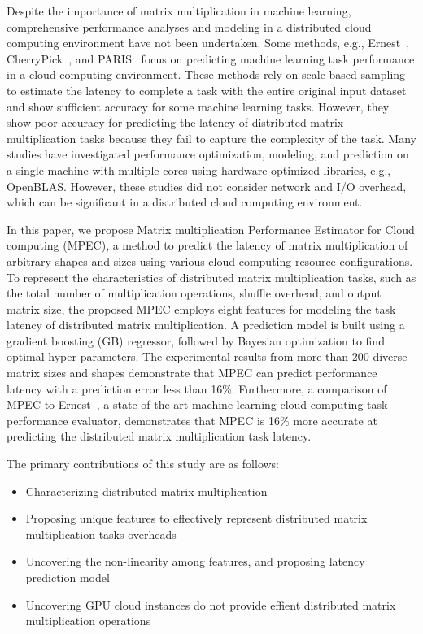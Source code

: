 \documentclass[10pt, conference, compsocconf]{IEEEtran}
\begin{document}
Despite the importance of matrix multiplication in machine learning, comprehensive performance analyses and modeling in a distributed cloud computing environment have not been undertaken. Some methods, e.g., Ernest~\cite{ernest}, CherryPick~\cite{cherrypick}, and PARIS~\cite{paris}  focus on predicting machine learning task performance in a cloud computing environment. These methods rely on scale-based sampling to estimate the latency to complete a task with the entire original input dataset and show sufficient accuracy for some machine learning tasks. However, they show poor accuracy for predicting the latency of distributed matrix multiplication tasks because they fail to capture the complexity of the task. Many studies have investigated performance optimization, modeling, and prediction on a single machine with multiple cores using hardware-optimized libraries, e.g., OpenBLAS. However, these studies did not consider network and I/O overhead, which can be significant in a distributed cloud computing environment.

In this paper, we propose Matrix multiplication Performance Estimator for Cloud computing (MPEC), a method to predict the latency of matrix multiplication of arbitrary shapes and sizes using various cloud computing resource configurations. To represent the characteristics of distributed matrix multiplication tasks, such as the total number of multiplication operations, shuffle overhead, and output matrix size, the proposed MPEC employs eight features for modeling the task latency of distributed matrix multiplication. A prediction model is built using a gradient boosting (GB) regressor, followed by Bayesian optimization to find optimal hyper-parameters. The experimental results from more than 200 diverse matrix sizes and shapes demonstrate that MPEC can predict performance latency with a prediction error less than 16\%. Furthermore, a comparison of MPEC to Ernest~\cite{ernest}, a state-of-the-art machine learning cloud computing task performance evaluator, demonstrates that MPEC is 16\% more accurate at predicting the distributed matrix multiplication task latency.

The primary contributions of this study are as follows:
\begin{itemize}
  \item{Characterizing distributed matrix multiplication}
  \item{Proposing unique features to effectively represent distributed matrix multiplication tasks overheads}
  \item{Uncovering the non-linearity among features, and proposing latency prediction model}
  \item{Uncovering GPU cloud instances do not provide effient distributed matrix multiplication operations}
\end{itemize}
\end{document}
